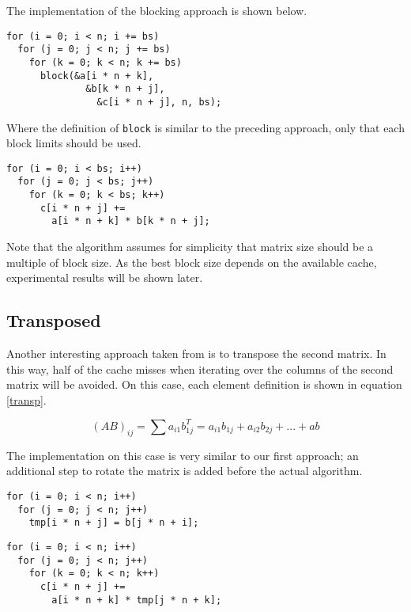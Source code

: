 \documentclass[a4paper,twocolumn]{article}
\begin{document}
\smallskip

The implementation of the blocking approach is shown below.

\begin{verbatim}
for (i = 0; i < n; i += bs)
  for (j = 0; j < n; j += bs)
    for (k = 0; k < n; k += bs)
      block(&a[i * n + k], 
              &b[k * n + j], 
                &c[i * n + j], n, bs);
\end{verbatim}

Where the definition of {\tt block} is similar to the preceding approach, only
that each block limits should be used.

\begin{verbatim}
for (i = 0; i < bs; i++)
  for (j = 0; j < bs; j++)
    for (k = 0; k < bs; k++)
      c[i * n + j] += 
        a[i * n + k] * b[k * n + j];
\end{verbatim}

Note that the algorithm assumes for simplicity that matrix size should be a 
multiple of block size. As the best block size depends on the available cache,
experimental results will be shown later.

\subsection{Transposed}

Another interesting approach taken from  \cite{cpumemory} is to transpose the 
second matrix. In this way, half of the cache misses when iterating over the
columns of the second matrix will be avoided. On this case, each element 
definition is shown in equation \ref{transp}.

\begin{equation}
(AB) _{ij} = \sum a _{i1} b _{1j} ^{T} = a _{i1} b _{1j} + a _{i2} b _{2j} + ... + ab
\label{transp}
\end{equation}

The implementation on this case is very similar to our first approach; 
an additional step to rotate the matrix is added before the actual algorithm.

\begin{verbatim}
for (i = 0; i < n; i++)
  for (j = 0; j < n; j++)
    tmp[i * n + j] = b[j * n + i];
\end{verbatim}

\begin{verbatim}  
for (i = 0; i < n; i++)
  for (j = 0; j < n; j++)
    for (k = 0; k < n; k++)
      c[i * n + j] += 
        a[i * n + k] * tmp[j * n + k];
\end{verbatim}
\end{document}

